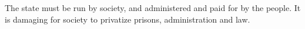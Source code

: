 The state must be run by society, and administered and paid for by the people.
It is damaging for society to privatize prisons, administration and law.